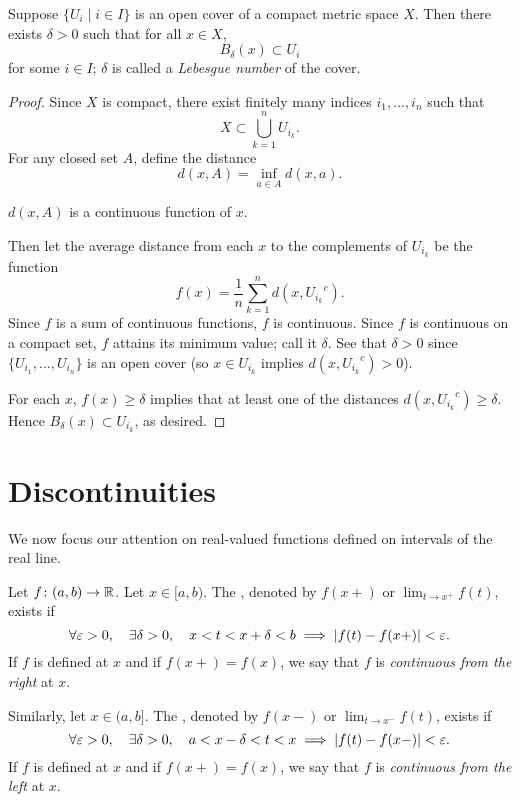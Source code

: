 \begin{lemma}
Suppose $\{U_i\mid i\in I\}$ is an open cover of a compact metric space $X$. Then there exists $\delta>0$ such that for all $x\in X$,
\[B_\delta(x)\subset U_i\]
for some $i\in I$; $\delta$ is called a \emph{Lebesgue number} of the cover.
\end{lemma}

\begin{proof}
Since $X$ is compact, there exist finitely many indices $i_1,\dots,i_n$ such that
\[X\subset\bigcup_{k=1}^{n}U_{i_k}.\]
For any closed set $A$, define the distance
\[d(x,A)=\inf_{a\in A}d(x,a).\]
\begin{claim}
$d(x,A)$ is a continuous function of $x$.
\end{claim}

Then let the average distance from each $x$ to the complements of $U_{i_k}$ be the function
\[f(x)=\frac{1}{n}\sum_{k=1}^{n}d(x,{U_{i_k}}^c).\]
Since $f$ is a sum of continuous functions, $f$ is continuous. Since $f$ is continuous on a compact set, $f$ attains its minimum value; call it $\delta$. See that $\delta>0$ since $\{U_{i_1},\dots,U_{i_n}\}$ is an open cover (so $x\in U_{i_k}$ implies $d(x,{U_{i_k}}^c)>0$).

For each $x$, $f(x)\ge\delta$ implies that at least one of the distances $d(x,{U_{i_k}}^c)\ge\delta$. Hence $B_\delta(x)\subset U_{i_k}$, as desired.
\end{proof}
\pagebreak

\section{Discontinuities}
We now focus our attention on real-valued functions defined on intervals of the real line.

\begin{definition}
Let $f\colon (a,b)\to\mathbb R$. Let $x\in[a,b)$. The , denoted by $f(x+)$ or $\displaystyle\lim_{t\to x^+}f(t)$, exists if
\[\forall\varepsilon>0,\quad\exists\delta>0,\quad x<t<x+\delta<b\implies\left|f(t)-f(x+)\right|<\varepsilon.\]
If $f$ is defined at $x$ and if $f(x+)=f(x)$, we say that $f$ is \emph{continuous from the right} at $x$.

Similarly, let $x\in(a,b]$. The , denoted by $f(x-)$ or $\displaystyle\lim_{t\to x^-}f(t)$, exists if
\[\forall\varepsilon>0,\quad\exists\delta>0,\quad a<x-\delta<t<x\implies\left|f(t)-f(x-)\right|<\varepsilon.\]
If $f$ is defined at $x$ and if $f(x+)=f(x)$, we say that $f$ is \emph{continuous from the left} at $x$.
\end{definition}

